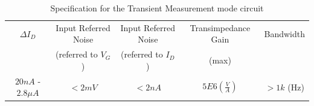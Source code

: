 \begin{table}[!htbp]
    {\fontfamily{}\fontsize{10}{14}\selectfont
    \centering
    \begin{tabular}{c|c|c|c|c}
        $\Delta I_D$&Input Referred Noise&Input Referred Noise&Transimpedance Gain &Bandwidth\\
                   & (referred to $V_G$)& (referred to $I_D$)  & (max) & \\
        \hline
        $20n A$ - $2.8\mu A$&$< 2m V$& $< 2n A$&$5E6(\frac{V}{A})$&$> 1k$ (Hz)\\
    \end{tabular}
    \caption{Specification for the Transient Measurement mode circuit}
    \label{tb:ACSpec}
    }
\end{table}





 


